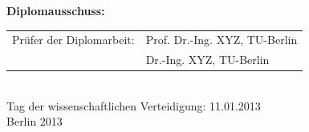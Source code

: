 \begin{titlepage}
\begin{center}
    \large \textbf{Diplomausschuss:}

    \vspace{.2cm}

		\begin{tabular}{rl}
		Pr\"ufer der Diplomarbeit:	& Prof. Dr.-Ing. XYZ, TU-Berlin\\
						& Dr.-Ing. XYZ, TU-Berlin\\
		\end{tabular}\\

    \vspace{2cm}
    \large Tag der wissenschaftlichen Verteidigung: 11.01.2013\\
    \vspace{0.5cm}
    \large Berlin 2013\\

  \end{center}
\end{titlepage}

